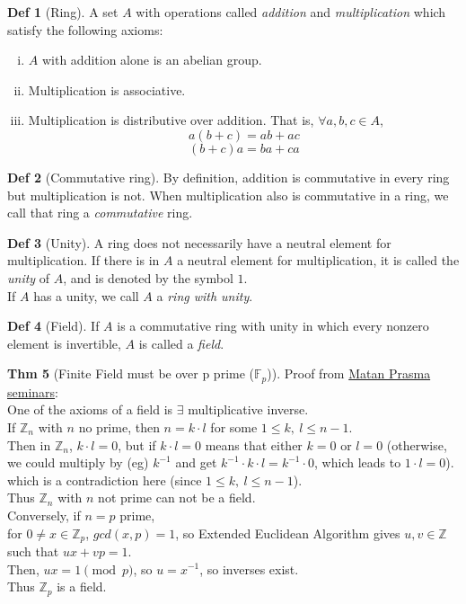 \documentclass{article}
\theoremstyle{definition}
\newtheorem{definition}{Def}[section]
\newtheorem{theorem}[definition]{Thm}
\begin{document}
\begin{definition}[Ring]
    A set $A$ with operations called \emph{addition} and \emph{multiplication} which satisfy the following axioms:
    \begin{enumerate}[i.]
	\item $A$ with addition alone is an abelian group.
	\item Multiplication is associative.
	\item Multiplication is distributive over addition. That is, $\forall a,b,c \in A$,
	    $$a(b+c) = ab + ac$$
	    $$(b+c)a = ba + ca$$
    \end{enumerate}
\end{definition}

\begin{definition}[Commutative ring]
    By definition, addition is commutative in every ring but multiplication is not. When multiplication also is commutative in a ring, we call that ring a \emph{commutative} ring.
\end{definition}

\begin{definition}[Unity]
    A ring does not necessarily have a neutral element for multiplication. If there is in $A$ a neutral element for multiplication, it is called the \emph{unity} of $A$, and is denoted by the symbol $1$.
    \\
    If $A$ has a unity, we call $A$ a \emph{ring with unity}.
\end{definition}

\begin{definition}[Field]
    If $A$ is a commutative ring with unity in which every nonzero element is invertible, $A$ is called a \emph{field}.
\end{definition}

\begin{theorem}[Finite Field must be over p prime ($\mathbb{F}_p$)]
    Proof from \href{https://github.com/aragonzkresearch/blog/blob/main/pdf/Aragon_Math_Seminar.pdf}{Matan Prasma seminars}:\\
    One of the axioms of a field is $\exists$ multiplicative inverse.\\
    If $\mathbb{Z}_n$ with $n$ no prime, then $n= k \cdot l$ for some $1 \leq k,~l \leq n-1$.\\
    Then in $\mathbb{Z}_n$, $k \cdot l = 0$, but if $k \cdot l=0$ means that either $k=0$ or $l=0$ (otherwise, we could multiply by (eg) $k^{-1}$ and get $k^{-1} \cdot k \cdot l = k^{-1} \cdot 0$, which leads to $1 \cdot l = 0$).\\
    which is a contradiction here (since $1 \leq k,~l \leq n-1$).\\
    Thus $\mathbb{Z}_n$ with $n$ not prime can not be a field.\\
    Conversely, if $n = p$ prime,\\
    for $0 \neq x \in \mathbb{Z}_p$, $gcd(x, p)=1$, so Extended Euclidean Algorithm gives $u, v \in \mathbb{Z}$ such that $u x + v p = 1$.\\
    Then, $ux=1 \pmod p$, so $u=x^{-1}$, so inverses exist.\\
    Thus $\mathbb{Z}_p$ is a field.
\end{theorem}
\end{document}

